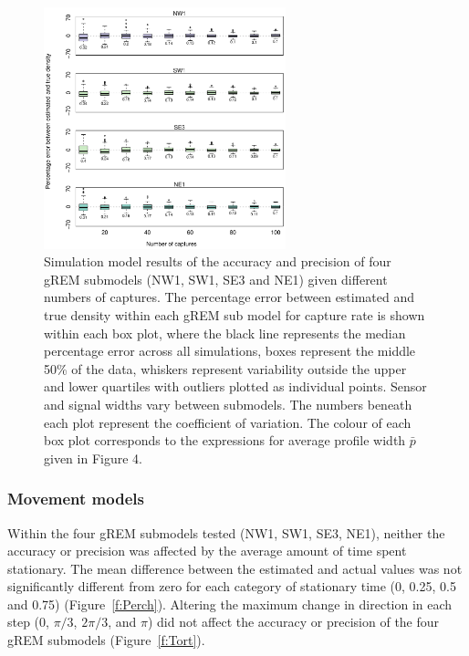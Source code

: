 \documentclass[a4paper,10pt,reqno,oneside]{amsart}
\begin{document}
\begin{figure}[t]
       \centering
	\includegraphics[width=7cm]{imgs/ResultsNoCaptures.pdf}
        \caption{Simulation model results of the accuracy and precision of four gREM submodels (NW1, SW1, SE3 and NE1) given different numbers of captures. The percentage error between estimated and true density within each gREM sub model for capture rate is shown within each box plot, where the black line represents the median percentage error across all simulations, boxes represent the middle 50\% of the data, whiskers represent variability outside the upper and lower quartiles with outliers plotted as individual points. Sensor and signal widths vary between submodels. The numbers beneath each plot represent the coefficient of variation. The colour of each box plot corresponds to the expressions for average profile width $\bar{p}$ given in Figure 4. }            
	\label{f:Captures}
\end{figure}


\subsubsection*{Movement models}

Within the four gREM submodels tested (NW1, SW1, SE3, NE1), neither the accuracy or precision was affected by the average amount of time spent stationary. The mean difference between the estimated and actual values was not significantly different from zero for each category of stationary time (0, 0.25, 0.5 and 0.75) (Figure~\ref{f:Perch}). Altering the maximum change in direction in each step (0, $\pi/3$, $2\pi/3$, and $\pi$) did not affect the accuracy or precision of the four gREM submodels (Figure~\ref{f:Tort}). 
\end{document}

